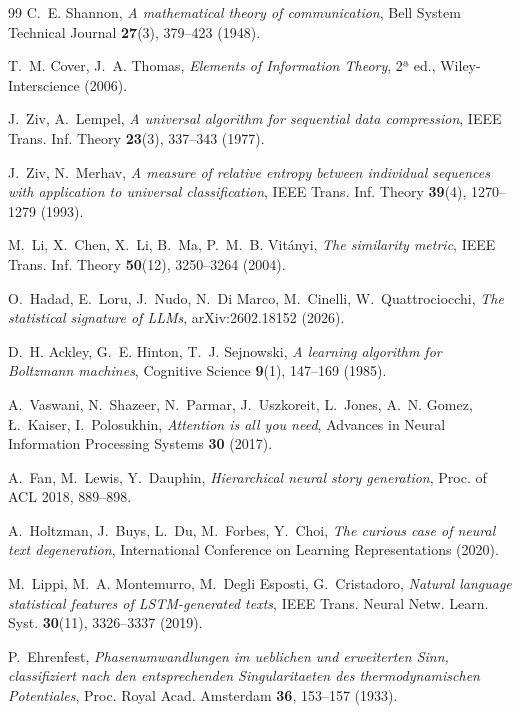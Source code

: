 \documentclass[12pt,a4paper,oneside]{report}
\begin{document}
\begin{thebibliography}{99}
C.~E. Shannon,
\emph{A mathematical theory of communication},
Bell System Technical Journal \textbf{27}(3), 379--423 (1948).

T.~M. Cover, J.~A. Thomas,
\emph{Elements of Information Theory}, 2ª ed.,
Wiley-Interscience (2006).

J.~Ziv, A.~Lempel,
\emph{A universal algorithm for sequential data compression},
IEEE Trans. Inf. Theory \textbf{23}(3), 337--343 (1977).

J.~Ziv, N.~Merhav,
\emph{A measure of relative entropy between individual sequences with
application to universal classification},
IEEE Trans. Inf. Theory \textbf{39}(4), 1270--1279 (1993).

M.~Li, X.~Chen, X.~Li, B.~Ma, P.~M.~B. Vitányi,
\emph{The similarity metric},
IEEE Trans. Inf. Theory \textbf{50}(12), 3250--3264 (2004).

O.~Hadad, E.~Loru, J.~Nudo, N.~Di Marco, M.~Cinelli, W.~Quattrociocchi,
\emph{The statistical signature of LLMs},
arXiv:2602.18152 (2026).

D.~H. Ackley, G.~E. Hinton, T.~J. Sejnowski,
\emph{A learning algorithm for Boltzmann machines},
Cognitive Science \textbf{9}(1), 147--169 (1985).

A.~Vaswani, N.~Shazeer, N.~Parmar, J.~Uszkoreit, L.~Jones, A.~N. Gomez,
Ł.~Kaiser, I.~Polosukhin,
\emph{Attention is all you need},
Advances in Neural Information Processing Systems \textbf{30} (2017).

A.~Fan, M.~Lewis, Y.~Dauphin,
\emph{Hierarchical neural story generation},
Proc. of ACL 2018, 889--898.

A.~Holtzman, J.~Buys, L.~Du, M.~Forbes, Y.~Choi,
\emph{The curious case of neural text degeneration},
International Conference on Learning Representations (2020).

M.~Lippi, M.~A. Montemurro, M.~Degli Esposti, G.~Cristadoro,
\emph{Natural language statistical features of LSTM-generated texts},
IEEE Trans. Neural Netw. Learn. Syst. \textbf{30}(11), 3326--3337 (2019).

P.~Ehrenfest,
\emph{Phasenumwandlungen im ueblichen und erweiterten Sinn, classifiziert nach
den entsprechenden Singularitaeten des thermodynamischen Potentiales},
Proc. Royal Acad. Amsterdam \textbf{36}, 153--157 (1933).


\end{thebibliography}
\end{document}
